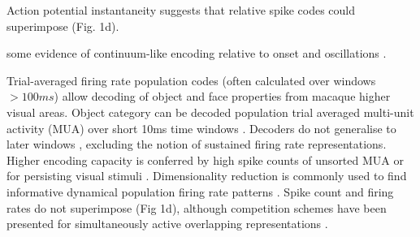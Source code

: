 \documentclass{article}
\begin{document}
Action potential instantaneity suggests that relative spike codes could superimpose (Fig. 1d).

some evidence of continuum-like encoding relative to onset \cite{gollisch2008rapid, storchi2012comparison} and oscillations \cite{havenith2011synchrony}.

Trial-averaged firing rate population codes (often calculated over windows $>100ms$) allow decoding of object \cite{hong2016explicit} and face \cite{chang2017code} properties from macaque higher visual areas. 
Object category can be decoded population trial averaged multi-unit activity (MUA) over short 10ms time windows \cite{kar2019evidence}. Decoders do not generalise to later windows \cite{kar2019evidence}, excluding the notion of sustained firing rate representations. Higher encoding capacity is conferred by high spike counts of unsorted MUA \cite{hong2016explicit, kar2019evidence} or for persisting visual stimuli \cite{hong2016explicit, chang2017code, kar2019evidence}. Dimensionality reduction is commonly used to find informative dynamical population firing rate patterns \cite{ahrens2012brain, mante2013context, cunningham2014dimensionality}.
Spike count and firing rates do not superimpose (Fig 1d), although competition schemes have been presented for simultaneously active overlapping representations \cite{bao2018representation}. 

\end{document}
